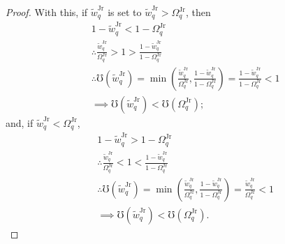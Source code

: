 \documentclass[hidelinks, nonatbib]{elsarticle}
\begin{document}
\begin{lemma}
\begin{proof}
        With this, if $\tilde{w}_{q}^{\text{Jr}}$ is set to $\tilde{w}_{q}^{\text{Jr}} > \Omega_{q}^{\text{Jr}}$, then
        \begin{align}
            &
            1 - \tilde{w}_{q}^{\text{Jr}}
            <
            1 - \Omega_{q}^{\text{Jr}}
            \\
            &\therefore
            \frac{
                \tilde{w}_{q}^{\text{Jr}}
            }{
                \Omega_{q}^{\text{Jr}}
            }
            >
            1
            >
            \frac{
                1 - \tilde{w}_{q}^{\text{Jr}}
            }{
                1 - \Omega_{q}^{\text{Jr}}
            }
            \\
            &\therefore
            \mho(\tilde{w}_{q}^{\text{Jr}}) 
            =
            \min\left(
                \frac{
                    \tilde{w}_{q}^{\text{Jr}}
                }{
                    \Omega_{q}^{\text{Jr}}
                }
                ,
                \frac{
                    1 - \tilde{w}_{q}^{\text{Jr}}
                }{
                    1 - \Omega_{q}^{\text{Jr}}
                }
            \right)
            =
            \frac{
                1 - \tilde{w}_{q}^{\text{Jr}}
            }{
                1 - \Omega_{q}^{\text{Jr}}
            }
            <
            1
            \\
            &\implies
            \mho(\tilde{w}_{q}^{\text{Jr}})
            <
            \mho(\Omega_{q}^{\text{Jr}})
            ;
        \end{align}
        and, if $\tilde{w}_{q}^{\text{Jr}} < \Omega_{q}^{\text{Jr}}$,
        \begin{align}
            &
            1 - \tilde{w}_{q}^{\text{Jr}}
            >
            1 - \Omega_{q}^{\text{Jr}}
            \\
            &\therefore
            \frac{
                \tilde{w}_{q}^{\text{Jr}}
            }{
                \Omega_{q}^{\text{Jr}}
            }
            <
            1
            <
            \frac{
                1 - \tilde{w}_{q}^{\text{Jr}}
            }{
                1 - \Omega_{q}^{\text{Jr}}
            }
            \\
            &\therefore
            \mho(\tilde{w}_{q}^{\text{Jr}}) 
            =
            \min\left(
                \frac{
                    \tilde{w}_{q}^{\text{Jr}}
                }{
                    \Omega_{q}^{\text{Jr}}
                }
                ,
                \frac{
                    1 - \tilde{w}_{q}^{\text{Jr}}
                }{
                    1 - \Omega_{q}^{\text{Jr}}
                }
            \right)
            =
            \frac{
                \tilde{w}_{q}^{\text{Jr}}
            }{
                \Omega_{q}^{\text{Jr}}
            }
            <
            1
            \\
            &\implies
            \mho(\tilde{w}_{q}^{\text{Jr}})
            <
            \mho(\Omega_{q}^{\text{Jr}})
            .
        \end{align}
        

\end{proof}
\end{lemma}
\end{document}
